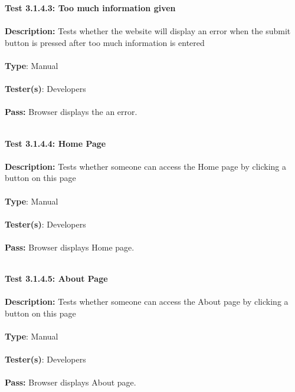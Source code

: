 \documentclass[12pt]{article}
\begin{document}
\begin{tcolorbox}
\textbf{Test 3.1.4.3: Too much information given} \\ \\
\textbf{Description:} Tests whether the website will display an error when the submit button is pressed after too much information is entered \\ \\
\textbf{Type}:  Manual\\ \\
\textbf{Tester(s)}:  Developers\\ \\
\textbf{Pass:} Browser displays the an error.\\ \\
\end{tcolorbox}

\begin{tcolorbox}
\textbf{Test 3.1.4.4: Home Page} \\ \\
\textbf{Description:} Tests whether someone can access the Home page by clicking a button on this page \\ \\
\textbf{Type}:  Manual\\ \\
\textbf{Tester(s)}:  Developers\\ \\
\textbf{Pass:} Browser displays Home page.\\ \\
\end{tcolorbox}

\begin{tcolorbox}
\textbf{Test 3.1.4.5: About Page} \\ \\
\textbf{Description:} Tests whether someone can access the About page by clicking a button on this page \\ \\
\textbf{Type}:  Manual\\ \\
\textbf{Tester(s)}:  Developers\\ \\
\textbf{Pass:} Browser displays About page.\\ \\
\end{tcolorbox}
\end{document}
